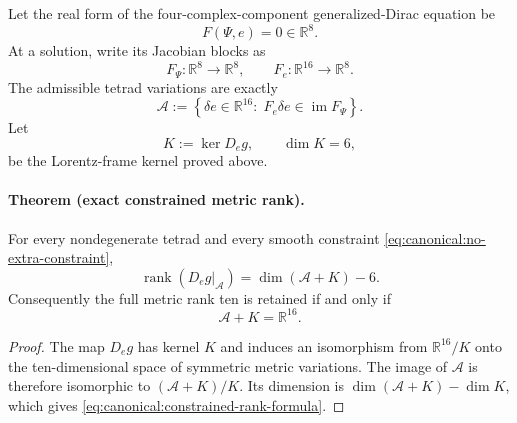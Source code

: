 Let the real form of the four-complex-component generalized-Dirac equation be
\begin{equation}
 F(\Psi,e)=0\in\mathbb R^8.
 \label{eq:canonical:no-extra-constraint}
\end{equation}
At a solution, write its Jacobian blocks as
\begin{equation}
 F_\Psi:\mathbb R^8\to\mathbb R^8,
 \qquad
 F_e:\mathbb R^{16}\to\mathbb R^8.
\end{equation}
The admissible tetrad variations are exactly
\begin{equation}
 \mathcal A
 :=\left\{\delta e\in\mathbb R^{16}:\;
 F_e\delta e\in\operatorname{im}F_\Psi\right\}.
 \label{eq:canonical:admissible-tetrad-space}
\end{equation}
Let
\begin{equation}
 K:=\ker D_e g,
 \qquad \dim K=6,
\end{equation}
be the Lorentz-frame kernel proved above.

\paragraph{Theorem (exact constrained metric rank).}
For every nondegenerate tetrad and every smooth constraint
\eqref{eq:canonical:no-extra-constraint},
\begin{equation}
 \boxed{
 \operatorname{rank}\left(D_e g\big|_{\mathcal A}\right)
 =\dim(\mathcal A+K)-6.}
 \label{eq:canonical:constrained-rank-formula}
\end{equation}
Consequently the full metric rank ten is retained if and only if
\begin{equation}
 \boxed{\mathcal A+K=\mathbb R^{16}.}
 \label{eq:canonical:rank-ten-transversality}
\end{equation}

\begin{proof}
The map $D_e g$ has kernel $K$ and induces an isomorphism from
$\mathbb R^{16}/K$ onto the ten-dimensional space of symmetric metric
variations.  The image of $\mathcal A$ is therefore isomorphic to
$(\mathcal A+K)/K$.  Its dimension is
$\dim(\mathcal A+K)-\dim K$, which gives
\eqref{eq:canonical:constrained-rank-formula}.
\end{proof}

